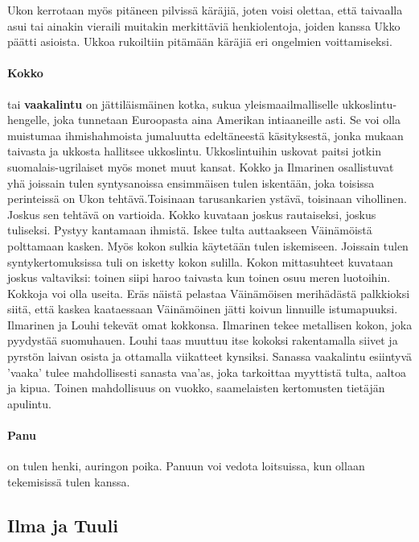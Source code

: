     Ukon kerrotaan myös pitäneen pilvissä käräjiä, joten voisi olettaa, että taivaalla asui 
    tai ainakin vieraili muitakin merkittäviä henkiolentoja, joiden kanssa Ukko päätti asioista. 
    Ukkoa rukoiltiin pitämään käräjiä eri ongelmien voittamiseksi.

  \paragraph{Kokko} tai \textbf{vaakalintu} on jättiläismäinen kotka, sukua yleismaailmalliselle 
    ukkos\-lintu-hengelle, joka tunnetaan Euroopasta aina Amerikan intiaaneille asti. Se voi olla 
    muistumaa ihmishahmoista jumaluutta edeltäneestä käsityksestä, jonka mukaan taivasta ja 
    ukkosta hallitsee ukkoslintu. Ukkoslintuihin uskovat paitsi jotkin suomalais-ugrilaiset myös 
    monet muut kansat. Kokko ja Ilmarinen osallistuvat yhä joissain tulen syntysanoissa 
    ensimmäisen tulen iskentään, joka toisissa perinteissä on Ukon tehtävä.Toisinaan 
    tarusankarien ystävä, toisinaan vihollinen. Joskus sen tehtävä on vartioida. Kokko kuvataan 
    joskus rautaiseksi, joskus tuliseksi. Pystyy kantamaan ihmistä. Iskee tulta auttaakseen 
    Väinämöistä polttamaan kasken. Myös kokon sulkia käytetään tulen iskemiseen. Joissain tulen 
    syntykertomuksissa tuli on isketty kokon sulilla. Kokon mittasuhteet kuvataan joskus 
    valtaviksi: toinen siipi haroo taivasta kun toinen osuu meren luotoihin. Kokkoja voi olla 
    useita. Eräs näistä pelastaa Väinämöisen merihädästä palkkioksi siitä, että kaskea 
    kaataessaan Väinämöinen jätti koivun linnuille istumapuuksi. Ilmarinen ja Louhi tekevät 
    omat kokkonsa. Ilmarinen tekee metallisen kokon, joka pyydystää suomuhauen. Louhi taas 
    muuttuu itse kokoksi rakentamalla siivet ja pyrstön laivan osista ja ottamalla viikatteet 
    kynsiksi. Sanassa vaakalintu esiintyvä ’vaaka’ tulee mahdollisesti sanasta vaa’as, joka 
    tarkoittaa myyttistä tulta, aaltoa ja kipua. Toinen mahdollisuus on vuokko, saamelaisten 
    kertomusten tietäjän apulintu.
  \paragraph{Panu} on tulen henki, auringon poika. Panuun voi vedota loitsuissa, kun ollaan 
    tekemisissä tulen kanssa. 

  
  
\subsection{Ilma ja Tuuli}

